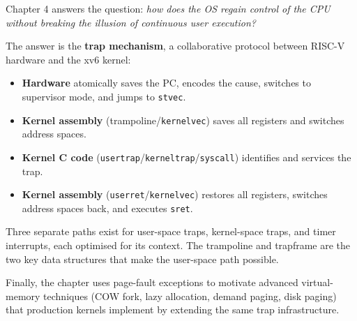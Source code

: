 \documentclass[11pt, a4paper]{article}
\begin{document}
\begin{tcolorbox}[summary, title={Chapter 4 — Complete Summary}]
Chapter 4 answers the question: \emph{how does the OS regain control of the CPU without breaking the illusion of continuous user execution?}

The answer is the \textbf{trap mechanism}, a collaborative protocol between RISC-V hardware and the xv6 kernel:

\begin{itemize}[leftmargin=1.5em, itemsep=0.2em]
  \item \textbf{Hardware} atomically saves the PC, encodes the cause, switches to supervisor mode, and jumps to \lstinline|stvec|.
  \item \textbf{Kernel assembly} (trampoline/\lstinline|kernelvec|) saves all registers and switches address spaces.
  \item \textbf{Kernel C code} (\lstinline|usertrap|/\lstinline|kerneltrap|/\lstinline|syscall|) identifies and services the trap.
  \item \textbf{Kernel assembly} (\lstinline|userret|/\lstinline|kernelvec|) restores all registers, switches address spaces back, and executes \lstinline|sret|.
\end{itemize}

Three separate paths exist for user-space traps, kernel-space traps, and timer interrupts, each optimised for its context. The trampoline and trapframe are the two key data structures that make the user-space path possible.

Finally, the chapter uses page-fault exceptions to motivate advanced virtual-memory techniques (COW fork, lazy allocation, demand paging, disk paging) that production kernels implement by extending the same trap infrastructure.
\end{tcolorbox}
\end{document}
